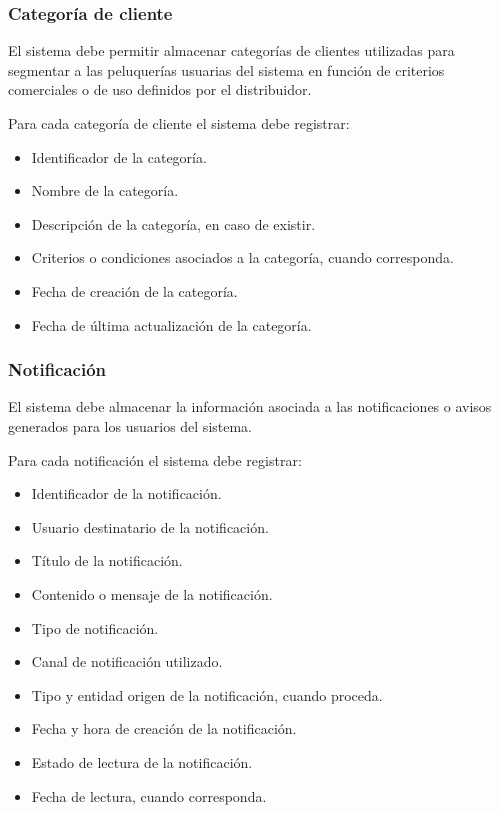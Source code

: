 \subsubsection*{Categoría de cliente}

El sistema debe permitir almacenar categorías de clientes utilizadas para segmentar a las peluquerías usuarias del sistema en función de criterios comerciales o de uso definidos por el distribuidor.

Para cada categoría de cliente el sistema debe registrar:

\begin{itemize}
    \item Identificador de la categoría.
    \item Nombre de la categoría.
    \item Descripción de la categoría, en caso de existir.
    \item Criterios o condiciones asociados a la categoría, cuando corresponda.
    \item Fecha de creación de la categoría.
    \item Fecha de última actualización de la categoría.
\end{itemize}

\subsubsection*{Notificación}

El sistema debe almacenar la información asociada a las notificaciones o avisos generados para los usuarios del sistema.

Para cada notificación el sistema debe registrar:

\begin{itemize}
    \item Identificador de la notificación.
    \item Usuario destinatario de la notificación.
    \item Título de la notificación.
    \item Contenido o mensaje de la notificación.
    \item Tipo de notificación.
    \item Canal de notificación utilizado.
    \item Tipo y entidad origen de la notificación, cuando proceda.
    \item Fecha y hora de creación de la notificación.
    \item Estado de lectura de la notificación.
    \item Fecha de lectura, cuando corresponda.
\end{itemize}

